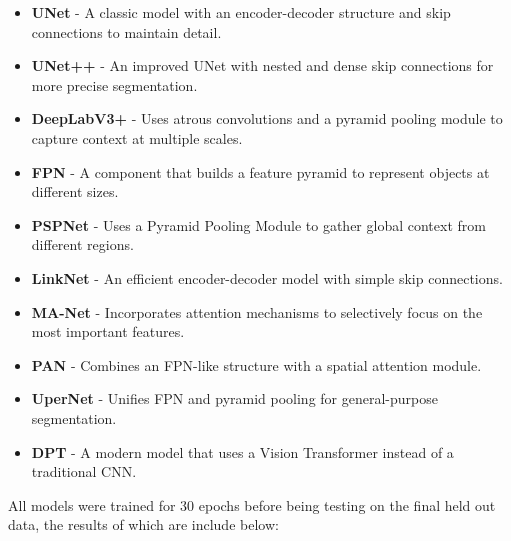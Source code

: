 \documentclass[twoside,11pt]{article}
\begin{document}
\begin{itemize}
    \item \textbf{UNet} - A classic model with an encoder-decoder structure and skip connections to maintain detail.
    \item \textbf{UNet++} - An improved UNet with nested and dense skip connections for more precise segmentation.
    \item \textbf{DeepLabV3+} - Uses atrous convolutions and a pyramid pooling module to capture context at multiple scales.
    \item \textbf{FPN} - A component that builds a feature pyramid to represent objects at different sizes.
    \item \textbf{PSPNet} - Uses a Pyramid Pooling Module to gather global context from different regions.
    \item \textbf{LinkNet} - An efficient encoder-decoder model with simple skip connections.
    \item \textbf{MA-Net} - Incorporates attention mechanisms to selectively focus on the most important features.
    \item \textbf{PAN} - Combines an FPN-like structure with a spatial attention module.
    \item \textbf{UperNet} - Unifies FPN and pyramid pooling for general-purpose segmentation.
    \item \textbf{DPT} - A modern model that uses a Vision Transformer instead of a traditional CNN.
\end{itemize}
 All models were trained for 30 epochs before being testing on the final held out data, the results of which are include below:
\end{document}
